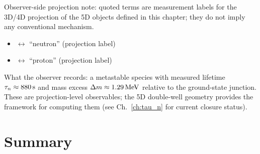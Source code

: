 
\begin{observerbox}
Observer-side projection note: quoted terms are measurement labels for the
3D/4D projection of the 5D objects defined in this chapter; they do not
imply any conventional mechanism.

\begin{itemize}
    \item \MetastableJunction{} $\leftrightarrow$ ``neutron'' (projection label)
    \item \AnchorJunction{} $\leftrightarrow$ ``proton'' (projection label)
\end{itemize}

What the observer records: a metastable species with measured lifetime
$\tau_n \approx 880\,\mathrm{s}$ and mass excess $\Delta m \approx 1.29\,\mathrm{MeV}$
relative to the ground-state junction. These are projection-level
observables; the 5D double-well geometry provides the framework for computing them
(see Ch.~\ref{ch:tau_n} for current closure status).
\end{observerbox}

\section{Summary}
\label{sec:metastable:summary}

